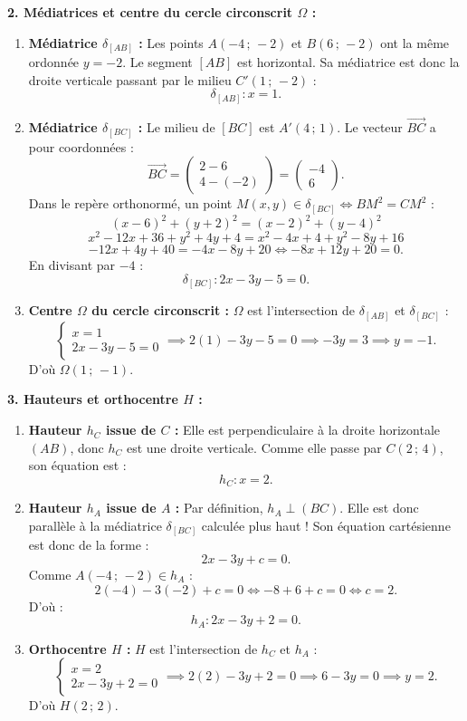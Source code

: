 \documentclass[11pt,a4paper]{article}
\newcommand{\vect}[1]{\overrightarrow{#1}}
\begin{document}
\begin{correctionbox}
\textbf{2. Médiatrices et centre du cercle circonscrit $\Omega$ :}
\begin{enumerate}[leftmargin=1cm]
    \item[(a)] \textbf{Médiatrice $\delta_{[AB]}$ :} Les points $A(-4\,;\,-2)$ et $B(6\,;\,-2)$ ont la même ordonnée $y = -2$. Le segment $[AB]$ est horizontal. Sa médiatrice est donc la droite verticale passant par le milieu $C'(1\,;\,-2)$ :
    \[
    \delta_{[AB]} : x = 1.
    \]
    \item[(b)] \textbf{Médiatrice $\delta_{[BC]}$ :} Le milieu de $[BC]$ est $A'(4\,;\,1)$. Le vecteur $\vect{BC}$ a pour coordonnées :
    \[
    \vect{BC} = \begin{pmatrix} 2 - 6 \\ 4 - (-2) \end{pmatrix} = \begin{pmatrix} -4 \\ 6 \end{pmatrix}.
    \]
    Dans le repère orthonormé, un point $M(x, y) \in \delta_{[BC]} \iff BM^2 = CM^2$ :
    \[
    (x - 6)^2 + (y + 2)^2 = (x - 2)^2 + (y - 4)^2
    \]
    \[
    x^2 - 12x + 36 + y^2 + 4y + 4 = x^2 - 4x + 4 + y^2 - 8y + 16
    \]
    \[
    -12x + 4y + 40 = -4x - 8y + 20 \iff -8x + 12y + 20 = 0.
    \]
    En divisant par $-4$ :
    \[
    \delta_{[BC]} : 2x - 3y - 5 = 0.
    \]
    \item[(c)] \textbf{Centre $\Omega$ du cercle circonscrit :} $\Omega$ est l'intersection de $\delta_{[AB]}$ et $\delta_{[BC]}$ :
    \[
    \begin{cases}
    x = 1 \\
    2x - 3y - 5 = 0
    \end{cases}
    \implies 2(1) - 3y - 5 = 0 \implies -3y = 3 \implies y = -1.
    \]
    D'où $\Omega(1\,;\,-1)$.
\end{enumerate}

\textbf{3. Hauteurs et orthocentre $H$ :}
\begin{enumerate}[leftmargin=1cm]
    \item[(a)] \textbf{Hauteur $h_C$ issue de $C$ :} Elle est perpendiculaire à la droite horizontale $(AB)$, donc $h_C$ est une droite verticale. Comme elle passe par $C(2\,;\,4)$, son équation est :
    \[
    h_C : x = 2.
    \]
    \item[(b)] \textbf{Hauteur $h_A$ issue de $A$ :} Par définition, $h_A \perp (BC)$. Elle est donc parallèle à la médiatrice $\delta_{[BC]}$ calculée plus haut ! Son équation cartésienne est donc de la forme :
    \[
    2x - 3y + c = 0.
    \]
    Comme $A(-4\,;\,-2) \in h_A$ :
    \[
    2(-4) - 3(-2) + c = 0 \iff -8 + 6 + c = 0 \iff c = 2.
    \]
    D'où :
    \[
    h_A : 2x - 3y + 2 = 0.
    \]
    \item[(c)] \textbf{Orthocentre $H$ :} $H$ est l'intersection de $h_C$ et $h_A$ :
    \[
    \begin{cases}
    x = 2 \\
    2x - 3y + 2 = 0
    \end{cases}
    \implies 2(2) - 3y + 2 = 0 \implies 6 - 3y = 0 \implies y = 2.
    \]
    D'où $H(2\,;\,2)$.
\end{enumerate}


\end{correctionbox}
\end{document}
